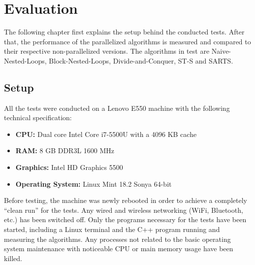 \chapter{Evaluation} \label{chapter:Evaluation}
The following chapter first explains the setup behind the conducted tests. After that, the performance of the parallelized algorithms is measured and compared to their respective non-parallelized versions. The algorithms in test are Naive-Nested-Loops, Block-Nested-Loops, Divide-and-Conquer, ST-S and SARTS. 

\section{Setup}

All the tests were conducted on a Lenovo E550 machine with the following technical specification: 
\begin{itemize}
	\item \textbf{CPU:} Dual core Intel Core i7-5500U with a 4096 KB cache
	\item \textbf{RAM:} 8 GB DDR3L 1600 MHz
	\item \textbf{Graphics:} Intel HD Graphics 5500
	\item \textbf{Operating System:} Linux Mint 18.2 Sonya 64-bit
\end{itemize}

Before testing, the machine was newly rebooted in order to achieve a completely ``clean run'' for the tests. Any wired and wireless networking (WiFi, Bluetooth, etc.) has been switched off. Only the programs necessary for the tests have been started, including a Linux terminal and the C++ program running and measuring the algorithms. Any processes not related to the basic operating system maintenance with noticeable CPU or main memory usage have been killed. %

